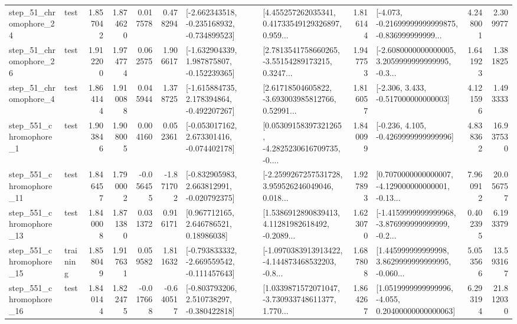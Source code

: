\begin{tabular}{llrrrrllrlrr}
   step\_51\_chromophore\_24 &      test &      1.857042 &    1.874620 &      0.017578 &  0.478294 &  [-2.662343518, -0.235168932, -0.734899523] &  [4.455257262035341, 0.41733549129326897, 0.959... &       1.816144 &  [-4.073, -0.21699999999999875, -0.836999999999... &            4.248001 &          2.309977 \\
   step\_51\_chromophore\_26 &      test &      1.912200 &    1.974774 &      0.062575 &  1.906617 &   [-1.632904339, 1.987875807, -0.152239365] &  [2.7813541758660265, -3.55154289173215, 0.3247... &       1.947753 &  [-2.6080000000000005, 3.2059999999999995, -0.3... &            1.641923 &          1.381825 \\
    step\_51\_chromophore\_4 &      test &      1.864144 &    1.910088 &      0.045944 &  1.378725 &   [-1.615884735, 2.178394864, -0.492207267] &  [2.61718504605822, -3.693003985812766, 0.52991... &       1.816057 &                [-2.306, 3.433, -0.517000000000003] &            4.121596 &          1.493333 \\
   step\_551\_chromophore\_1 &      test &      1.903846 &    1.908005 &      0.004160 &  0.052361 &   [-0.053017162, 2.673301416, -0.074402178] &  [0.05309158397321265, -4.2825230616709735, -0.... &       1.840099 &               [-0.236, 4.105, -0.4269999999999996] &            4.838362 &         16.937530 \\
  step\_551\_chromophore\_11 &      test &      1.846457 &    1.790002 &     -0.056455 & -1.871702 &   [-0.832905983, 2.663812991, -0.020792375] &  [-2.2599267257531728, 3.959526246049046, 0.018... &       1.927893 &  [0.7070000000000007, -4.129000000000001, -0.13... &            7.960912 &         20.056757 \\
  step\_551\_chromophore\_13 &      test &      1.840008 &    1.871380 &      0.031372 &  0.916171 &      [0.967712165, 2.646786521, 0.18986038] &  [1.5386912890839413, 4.11281982618492, -0.2089... &       1.623070 &  [-1.4159999999999968, -3.876999999999999, -0.2... &            0.402395 &          6.193379 \\
  step\_551\_chromophore\_15 &  training &      1.858049 &    1.917631 &      0.059582 &  1.811632 &  [-0.793833332, -2.669559542, -0.111457643] &  [-1.0970383913913422, -4.144873468532203, -0.8... &       1.687808 &  [1.445999999999998, 3.8629999999999995, -0.060... &            5.053566 &         13.593167 \\
  step\_551\_chromophore\_16 &      test &      1.840144 &    1.822475 &     -0.017668 & -0.640517 &   [-0.803793206, 2.510738297, -0.380422818] &  [1.0339871572071047, -3.730933748611377, 1.770... &       1.864267 &  [1.0519999999999996, -4.055, 0.20400000000000063] &            6.293194 &         21.812030 \\

\end{tabular}

